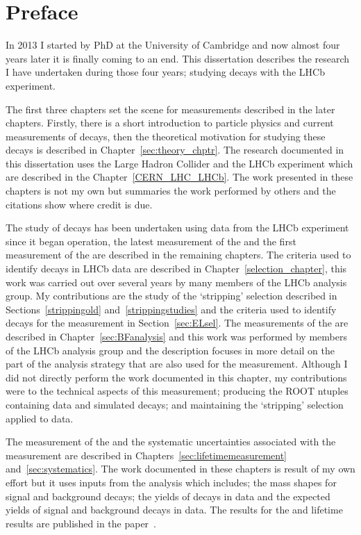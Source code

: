 \chapter{Preface}

In 2013 I started by PhD at the University of Cambridge and now almost four years later it is finally coming to an end. This dissertation describes the research I have undertaken during those four years; studying \bmumu decays with the LHCb experiment. 

The first three chapters set the scene for measurements described in the later chapters. Firstly, there is a short introduction to particle physics and current measurements of \bmumu decays, then the theoretical motivation for studying these decays is described in Chapter~\ref{sec:theory_chptr}. The research documented in this dissertation uses the Large Hadron Collider and the LHCb experiment which are described in the Chapter~\ref{CERN_LHC_LHCb}. The work presented in these chapters is not my own but summaries the work performed by others and the citations show where credit is due.

The study of \bmumu decays has been undertaken using data from the LHCb experiment since it began operation, the latest measurement of the \bmumu \BFs and the first measurement of the \bsmumu \el are described in the remaining chapters.
The criteria used to identify \bmumu decays in LHCb data are described in Chapter~\ref{selection_chapter}, this work was carried out over several years by many members of the \bmumu LHCb analysis group. My contributions are the study of the `stripping' selection described in Sections~\ref{strippingold} and~\ref{strippingstudies} and the criteria used to identify \bsmumu decays for the \el measurement in Section~\ref{sec:ELsel}.
The measurements of the \bmumu \BFs are described in Chapter~\ref{sec:BFanalysis} and this work was performed by members of the \bmumu LHCb analysis group and the description focuses in more detail on the part of the analysis strategy that are also used for the \el measurement. Although I did not directly perform the work documented in this chapter, my contributions were to the technical aspects of this measurement; producing the ROOT ntuples containing data and simulated decays; and maintaining the `stripping' selection applied to data. 

The measurement of the \bsmumu \el and the systematic uncertainties associated with the measurement are described in Chapters~\ref{sec:lifetimemeasurement} and~\ref{sec:systematics}. 
The work documented in these chapters is result of my own effort but it uses inputs from the \BF analysis which includes; the mass shapes for signal and background decays; the yields of \bsjpsiphi decays in data and the expected yields of signal and background decays in data. The results for the \bmumu \BF and \bsmumu \el lifetime results are published in the paper~\cite{Aaij:2017vad}.

